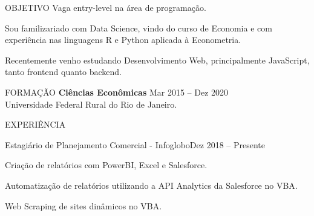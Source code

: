 \documentclass{resume}
\begin{document}

\begin{rSection}{OBJETIVO}
  Vaga entry-level na área de programação.

  Sou familizariado com Data Science, vindo do curso de Economia e com experiência nas
  linguagens R e Python aplicada à Econometria.

  Recentemente venho estudando Desenvolvimento Web, principalmente JavaScript,
  tanto frontend quanto backend.
  \vspace{5mm}
\end{rSection}


\begin{rSection}{FORMAÇÃO}
  {\bf Ciências Econômicas} \hfill {Mar 2015 -- Dez  2020}
  \\
  Universidade Federal Rural do Rio de Janeiro.
  \\
\end{rSection}


\begin{rSection}{EXPERIÊNCIA}
  \begin{rSubsection}{Estagiário de Planejamento Comercial - Infoglobo}{Dez 2018 -- Presente}{}
  \item
  \item Criação de relatórios com PowerBI, Excel e Salesforce.
  \item Automatização de relatórios utilizando a API Analytics da
    Salesforce no VBA.
  \item Web Scraping de sites dinâmicos no VBA.
    \vspace{5mm}
  \end{rSubsection}
\end{rSection}

\end{document}
